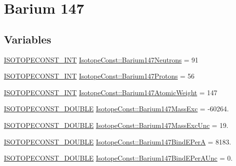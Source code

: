 \hypertarget{group___isotope_const-_barium-_ba147}{}\section{Barium 147}
\label{group___isotope_const-_barium-_ba147}
\subsection*{Variables}
\begin{DoxyCompactItemize}
\item 
\mbox{\hyperlink{group___isotope_const-_macros_ga5f18360b3e99483a35c32d789e62621c}{I\+S\+O\+T\+O\+P\+E\+C\+O\+N\+S\+T\+\_\+\+I\+NT}} \mbox{\hyperlink{group___isotope_const-_barium-_ba147_gaeb2089f331a5a25b12478fda67446508}{Isotope\+Const\+::\+Barium147\+Neutrons}} = 91
\item 
\mbox{\hyperlink{group___isotope_const-_macros_ga5f18360b3e99483a35c32d789e62621c}{I\+S\+O\+T\+O\+P\+E\+C\+O\+N\+S\+T\+\_\+\+I\+NT}} \mbox{\hyperlink{group___isotope_const-_barium-_ba147_ga495b052713d08eefefeada312a58da6b}{Isotope\+Const\+::\+Barium147\+Protons}} = 56
\item 
\mbox{\hyperlink{group___isotope_const-_macros_ga5f18360b3e99483a35c32d789e62621c}{I\+S\+O\+T\+O\+P\+E\+C\+O\+N\+S\+T\+\_\+\+I\+NT}} \mbox{\hyperlink{group___isotope_const-_barium-_ba147_gaeeda4ff9b8938cffa6d3bdeee7ea3072}{Isotope\+Const\+::\+Barium147\+Atomic\+Weight}} = 147
\item 
\mbox{\hyperlink{group___isotope_const-_macros_ga8f45a7272ce02c0b4c65c44636ed719a}{I\+S\+O\+T\+O\+P\+E\+C\+O\+N\+S\+T\+\_\+\+D\+O\+U\+B\+LE}} \mbox{\hyperlink{group___isotope_const-_barium-_ba147_ga128af40d463ce1b998a4efb24461ae57}{Isotope\+Const\+::\+Barium147\+Mass\+Exc}} = -\/60264.
\item 
\mbox{\hyperlink{group___isotope_const-_macros_ga8f45a7272ce02c0b4c65c44636ed719a}{I\+S\+O\+T\+O\+P\+E\+C\+O\+N\+S\+T\+\_\+\+D\+O\+U\+B\+LE}} \mbox{\hyperlink{group___isotope_const-_barium-_ba147_gafd21bf52a09062ba51c6d2709d26e808}{Isotope\+Const\+::\+Barium147\+Mass\+Exc\+Unc}} = 19.
\item 
\mbox{\hyperlink{group___isotope_const-_macros_ga8f45a7272ce02c0b4c65c44636ed719a}{I\+S\+O\+T\+O\+P\+E\+C\+O\+N\+S\+T\+\_\+\+D\+O\+U\+B\+LE}} \mbox{\hyperlink{group___isotope_const-_barium-_ba147_ga5a1aaef71f0f1d893b67e4dc2717eb6b}{Isotope\+Const\+::\+Barium147\+Bind\+E\+PerA}} = 8183.
\item 
\mbox{\hyperlink{group___isotope_const-_macros_ga8f45a7272ce02c0b4c65c44636ed719a}{I\+S\+O\+T\+O\+P\+E\+C\+O\+N\+S\+T\+\_\+\+D\+O\+U\+B\+LE}} \mbox{\hyperlink{group___isotope_const-_barium-_ba147_ga2a6888f04ff0870d7702f92bbd297fbc}{Isotope\+Const\+::\+Barium147\+Bind\+E\+Per\+A\+Unc}} = 0.

\end{DoxyCompactItemize}
